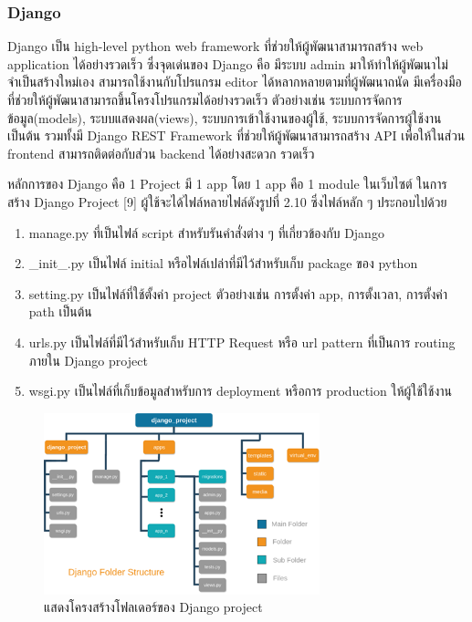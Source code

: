 \documentclass[12pt,oneside,openright,a4paper]{cpe-thai-project}
\begin{document}
\subsubsection{Django}
\par\setlength{\parindent}{5ex}
Django เป็น high-level python web framework ที่ช่วยให้ผู้พัฒนาสามารถสร้าง web application ได้อย่างรวดเร็ว ซึ่งจุดเด่นของ Django คือ มีระบบ admin มาให้ทำให้ผู้พัฒนาไม่จำเป็นสร้างใหม่เอง สามารถใช้งานกับโปรแกรม editor ได้หลากหลายตามที่ผู้พัฒนาถนัด มีเครื่องมือที่ช่วยให้ผู้พัฒนาสามารถขึ้นโครงโปรแกรมได้อย่างรวดเร็ว ตัวอย่างเช่น ระบบการจัดการข้อมูล(models), ระบบแสดงผล(views), ระบบการเข้าใช้งานของผู้ใช้, ระบบการจัดการผู้ใช้งาน เป็นต้น รวมทั้งมี Django REST Framework ที่ช่วยให้ผู้พัฒนาสามารถสร้าง API เพื่อให้ในส่วน frontend สามารถติดต่อกับส่วน backend ได้อย่างสะดวก รวดเร็ว

\par\setlength{\parindent}{5ex}
หลักการของ Django คือ 1 Project มี 1 app โดย 1 app คือ 1 module ในเว็บไซต์ ในการสร้าง Django Project [9] ผู้ใช้จะได้ไฟล์หลายไฟล์ดังรูปที่ 2.10 ซึ่งไฟล์หลัก ๆ ประกอบไปด้วย
\begin{enumerate}
  \item manage.py ที่เป็นไฟล์ script สำหรับรันคำสั่งต่าง ๆ ที่เกี่ยวข้องกับ Django
  \item _init_.py เป็นไฟล์ initial หรือไฟล์เปล่าที่มีไว้สำหรับเก็บ package ของ python
  \item setting.py เป็นไฟล์ที่ใช้ตั้งค่า project ตัวอย่างเช่น การตั้งค่า app, การตั้งเวลา, การตั้งค่า path เป็นต้น
  \item urls.py เป็นไฟล์ที่มีไว้สำหรับเก็บ HTTP Request หรือ url pattern ที่เป็นการ routing ภายใน Django project
  \item wsgi.py เป็นไฟล์ที่เก็บข้อมูลสำหรับการ deployment หรือการ production ให้ผู้ใช้ใช้งาน
\end{enumerate}


\newpage
\begin{figure}[!h]
  \centering
  \includegraphics[width=8cm]{./image/django.png}
  \caption{แสดงโครงสร้างโฟลเดอร์ของ Django project}
  \label{fig:django}
\end{figure}
\end{document}
